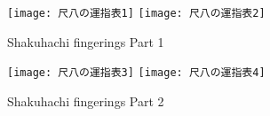 
\begin{figure}[h]
	\centering
	\texttt{[image: 尺八の運指表1]}
	\vspace{1cm}
	\texttt{[image: 尺八の運指表2]}
	\caption{Shakuhachi fingerings Part 1}
	\label{fig:shakuhachi_fingerings_1}
\end{figure}

\begin{figure}[h]
	\centering
	\texttt{[image: 尺八の運指表3]}
	\vspace{1cm}
	\texttt{[image: 尺八の運指表4]}
	\caption{Shakuhachi fingerings Part 2}
	\label{fig:shakuhachi_fingerings_2}
\end{figure}
